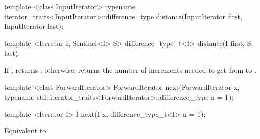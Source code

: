 %
\begin{removedblock}
\begin{itemdecl}
  template <class InputIterator>
      typename iterator_traits<InputIterator>::difference_type
         distance(InputIterator first, InputIterator last);
\end{itemdecl}
\end{removedblock}
\begin{addedblock}
\begin{itemdecl}
template <Iterator I, Sentinel<I> S>
  difference_type_t<I> distance(I first, S last);
\end{itemdecl}
\end{addedblock}

\begin{itemdescr}
\pnum
{}

\pnum
\effects
If 
\brk{}, returns ; otherwise,
returns the number of increments needed to get from
to
.

\pnum
{}
\end{itemdescr}

%
\begin{removedblock}
\begin{itemdecl}
template <class ForwardIterator>
  ForwardIterator next(ForwardIterator x,
    typename std::iterator_traits<ForwardIterator>::difference_type n = 1);
\end{itemdecl}
\end{removedblock}
\begin{addedblock}
\begin{itemdecl}
template <Iterator I>
  I next(I x, difference_type_t<I> n = 1);
\end{itemdecl}
\end{addedblock}

\begin{itemdescr}
\pnum
\effects Equivalent to 
\end{itemdescr}

